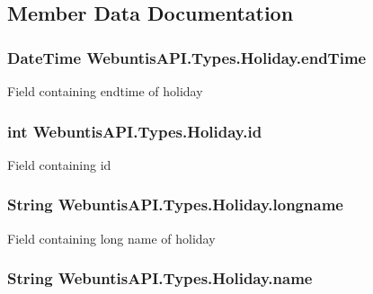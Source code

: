 \subsection{Member Data Documentation}
\hypertarget{struct_webuntis_a_p_i_1_1_types_1_1_holiday_a8554b4c5a0b600762065145df7666519}{
\subsubsection[{end\-Time}]{\setlength{\rightskip}{0pt plus 5cm}Date\-Time Webuntis\-A\-P\-I.\-Types.\-Holiday.\-end\-Time}}\label{struct_webuntis_a_p_i_1_1_types_1_1_holiday_a8554b4c5a0b600762065145df7666519}
Field containing endtime of holiday \hypertarget{struct_webuntis_a_p_i_1_1_types_1_1_holiday_af850132078feaf8f2395e20a0800d74a}{
\subsubsection[{id}]{\setlength{\rightskip}{0pt plus 5cm}int Webuntis\-A\-P\-I.\-Types.\-Holiday.\-id}}\label{struct_webuntis_a_p_i_1_1_types_1_1_holiday_af850132078feaf8f2395e20a0800d74a}
Field containing id \hypertarget{struct_webuntis_a_p_i_1_1_types_1_1_holiday_afb7e41fafeec189033e04da99946817f}{
\subsubsection[{longname}]{\setlength{\rightskip}{0pt plus 5cm}String Webuntis\-A\-P\-I.\-Types.\-Holiday.\-longname}}\label{struct_webuntis_a_p_i_1_1_types_1_1_holiday_afb7e41fafeec189033e04da99946817f}
Field containing long name of holiday \hypertarget{struct_webuntis_a_p_i_1_1_types_1_1_holiday_a092c9f61df2c8287135afb4551cbacdc}{
\subsubsection[{name}]{\setlength{\rightskip}{0pt plus 5cm}String Webuntis\-A\-P\-I.\-Types.\-Holiday.\-name}}\label{struct_webuntis_a_p_i_1_1_types_1_1_holiday_a092c9f61df2c8287135afb4551cbacdc}
